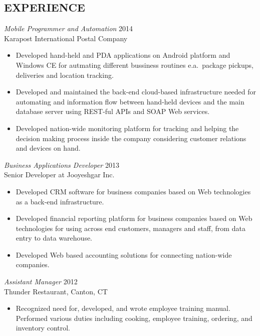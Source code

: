 \documentclass[margin, 10pt]{res} %
\begin{document}
\begin{resume}
\section{EXPERIENCE}

{\sl Mobile Programmer and Automation} \hfill 2014 \\
Karapost International Postal Company

\begin{itemize} \itemsep -2pt %
\item Developed hand-held and PDA applications on Android platform and Windows CE for autmating different bussiness
  routines e.a.\ package pickups, deliveries and location tracking.
\item Developed and maintained the back-end cloud-based infrastructure needed for automating and information flow between
  hand-held devices and the main database server using REST-ful APIs and SOAP Web services.
\item Developed nation-wide monitoring platform for tracking and helping the
  decision making process inside the company considering customer relations and devices on hand.
\end{itemize}
 
{\sl Business Applications Developer} \hfill 2013 \\
Senior Developer at Jooyeshgar Inc.
\begin{itemize} 
\item Developed CRM software for business companies based on Web technologies as a back-end infrastructure.
\item Developed financial reporting platform for business companies based on Web
technologies for using across end customers, managers and staff, from data entry
to data warehouse.
\item Developed Web based accounting solutions for connecting nation-wide companies.
\end{itemize} 

{\sl Assistant Manager} \hfill 2012 \\
Thunder Restaurant, Canton, CT
\begin{itemize}
\item Recognized need for, developed, and wrote employee training manual. Performed various duties including cooking, employee training, ordering, and inventory control. 
\end{itemize} 



\end{resume}
\end{document}
